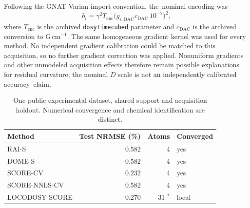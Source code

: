 \documentclass[mathematics,article,accept,moreauthors]{Definitions/mdpi}
\begin{document}
Following the GNAT Varian import convention, the~nominal encoding was
\begin{equation}
b_i=\gamma^2 T_{\mathrm{enc}}
 \bigl(g_{i,\mathrm{DAC}}c_{\mathrm{DAC}}\,10^{-2}\bigr)^2,
\end{equation}
where $T_{\mathrm{enc}}$ is the archived \texttt{dosytimecubed} parameter and
$c_{\mathrm{DAC}}$ is the archived conversion to G\,cm$^{-1}$.
The same homogeneous gradient kernel was used for every method.
No independent gradient calibration could be matched to this acquisition, so no further gradient correction was applied.
Nonuniform gradients and other unmodeled acquisition effects therefore
remain possible explanations for residual curvature; the nominal $D$ scale
is not an independently calibrated accuracy~claim.

\begin{table}[H]
\caption{One 
 public experimental dataset, shared support and acquisition
holdout. Numerical convergence and chemical identification are distinct.}
\label{tab:publicmixturerevision}
\small
\begin{tabularx}{\textwidth}{LRRL}\toprule
\textbf{Method} & \textbf{Test NRMSE} \textbf{(\%)} & \textbf{Atoms} & \textbf{Converged} \\ \midrule
RAI-S & 0.582 & 4 & yes \\
DOME-S & 0.582 & 4 & yes \\
SCORE-CV & 0.232 & 4 & yes \\
SCORE-NNLS-CV & 0.582 & 4 & yes \\
LOCODOSY-SCORE & 0.270 & 31 $^{*}$ & local \\
\bottomrule\end{tabularx}


\end{table}
\end{document}
